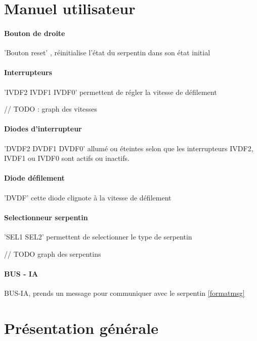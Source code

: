 \documentclass[10pt]{article}
\begin{document}
    \newpage
    \section{Manuel utilisateur}
    
    \paragraph{Bouton de droite} 'Bouton reset' , réinitialise l'état du serpentin dans son état initial
    
    \paragraph{Interrupteurs} 'IVDF2 IVDF1 IVDF0' permettent de régler la vitesse de défilement
    
    // TODO : graph des vitesses
    
    \paragraph{Diodes d'interrupteur} 'DVDF2 DVDF1 DVDF0' allumé ou éteintes selon que les interrupteurs IVDF2, IVDF1 ou IVDF0 sont actifs ou inactifs.
    
    \paragraph{Diode défilement} 'DVDF' cette diode clignote à la vitesse de défilement
    
    \paragraph{Selectionneur serpentin} 'SEL1 SEL2' permettent de selectionner le type de serpentin
    
    // TODO graph des serpentins
    
    \paragraph{BUS - IA} BUS-IA, prends un message pour communiquer avec le serpentin \ref{formatmsg}

    \newpage
    \section{Présentation générale}
    
\end{document}
